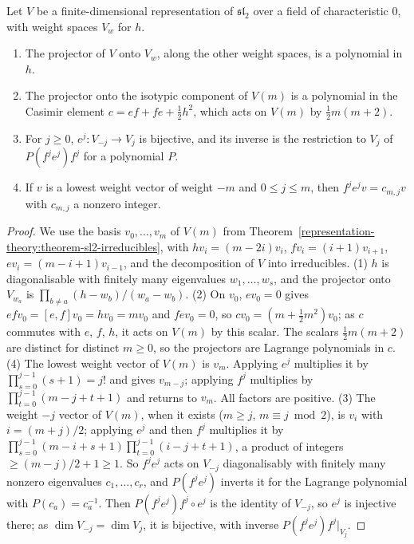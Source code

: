 \begin{lemma}\label{standard-conjectures:lemma-sl2-polynomials}
Let $V$ be a finite-dimensional representation of $\mathfrak{sl}_2$ over a field of characteristic $0$, with weight spaces $V_w$ for $h$.
\begin{enumerate}
\item The projector of $V$ onto $V_w$, along the other weight spaces, is a polynomial in $h$.
\item The projector onto the isotypic component of $V(m)$ is a polynomial in the Casimir element $c = ef + fe + \frac12h^2$, which acts on $V(m)$ by $\frac12m(m + 2)$.
\item For $j \geq 0$, $e^j \colon V_{-j} \to V_j$ is bijective, and its inverse is the restriction to $V_j$ of $P(f^je^j)f^j$ for a polynomial $P$.
\item If $v$ is a lowest weight vector of weight $-m$ and $0 \leq j \leq m$, then $f^je^jv = c_{m,j}v$ with $c_{m,j}$ a nonzero integer.
\end{enumerate}
\end{lemma}

\begin{proof}
We use the basis $v_0, \ldots, v_m$ of $V(m)$ from Theorem~\ref{representation-theory:theorem-sl2-irreducibles}, with $hv_i = (m - 2i)v_i$, $fv_i = (i + 1)v_{i+1}$, $ev_i = (m - i + 1)v_{i-1}$, and the decomposition of $V$
into irreducibles. (1) $h$ is diagonalisable with finitely many eigenvalues $w_1, \ldots, w_s$, and the projector onto $V_{w_a}$ is $\prod_{b \neq a}(h - w_b)/(w_a - w_b)$. (2) On $v_0$, $ev_0 = 0$ gives
$efv_0 = [e, f]v_0 = hv_0 = mv_0$ and $fev_0 = 0$, so $cv_0 = (m + \frac12m^2)v_0$; as $c$ commutes with $e$, $f$, $h$, it acts on $V(m)$ by this scalar. The scalars $\frac12m(m + 2)$ are distinct for distinct
$m \geq 0$, so the projectors are Lagrange polynomials in $c$. (4) The lowest weight vector of $V(m)$ is $v_m$. Applying $e^j$ multiplies it by $\prod_{s=0}^{j-1}(s + 1) = j!$ and gives $v_{m-j}$; applying $f^j$ multiplies by
$\prod_{t=0}^{j-1}(m - j + t + 1)$ and returns to $v_m$. All factors are positive. (3) The weight $-j$ vector of $V(m)$, when it exists ($m \geq j$, $m \equiv j \bmod 2$), is $v_i$ with $i = (m + j)/2$; applying $e^j$ and
then $f^j$ multiplies it by $\prod_{s=0}^{j-1}(m - i + s + 1)\prod_{t=0}^{j-1}(i - j + t + 1)$, a product of integers $\geq (m - j)/2 + 1 \geq 1$. So $f^je^j$ acts on $V_{-j}$ diagonalisably with finitely many nonzero eigenvalues
$c_1, \ldots, c_r$, and $P(f^je^j)$ inverts it for the Lagrange polynomial with $P(c_a) = c_a^{-1}$. Then $P(f^je^j)f^j \circ e^j$ is the identity of $V_{-j}$, so $e^j$ is injective there; as $\dim V_{-j} = \dim V_j$, it is
bijective, with inverse $P(f^je^j)f^j|_{V_j}$.
\end{proof}

